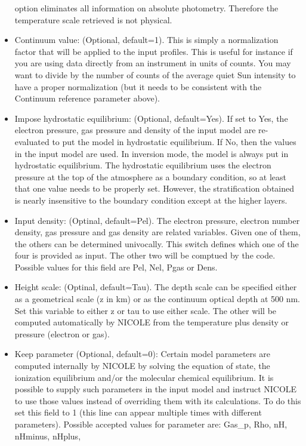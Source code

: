 \begin{itemize}
  option eliminates all information on absolute photometry. Therefore
  the temperature scale retrieved is not physical.
\item Continuum value: (Optional, default=1). This is simply a
  normalization factor that will be applied to the input
  profiles. This is useful for instance if you are using data
  directly from an instrument in units of counts. You may want to
  divide by the number of counts of the average quiet Sun intensity to
  have a proper normalization (but it needs to be consistent with the
  Continuum reference parameter above).
\item Impose hydrostatic equilibrium: (Optional, default=Yes). If set
  to Yes, the electron pressure, gas pressure and density of the input
  model are re-evaluated to put the model in hydrostatic
  equilibrium. If No, then the values in the input model are used. In
  inversion mode, the model is always put in hydrostatic equilibrium.
  The hydrostatic equilibrium uses the electron pressure at the top of
  the atmosphere as a boundary condition, so at least that one value
  needs to be properly set. However, the stratification obtained is nearly
  insensitive to the boundary condition except at the higher layers.
\item Input density: (Optinal, default=Pel). The electron pressure,
  electron number density, gas pressure and gas density are related
  variables. Given one of them, the others can be determined
  univocally. This switch defines which one of the four is provided
  as input. The other two will be comptued by the code. Possible
  values for this field are Pel, Nel, Pgas or Dens. 
\item Height scale: (Optinal, default=Tau). The depth scale can be
  specified either as a geometrical scale (z in km) or as the
  continuum optical depth at 500 nm. Set this variable to either z or
  tau to use either scale. The other will be computed automatically by
  NICOLE from the temperature plus density or pressure (electron or
  gas). 
\item Keep {parameter} (Optional, default=0): Certain model parameters
  are computed internally by NICOLE by solving the equation of state,
  the ionization equilibrium and/or the molecular chemical
  equilibrium. It is possible to supply such parameters in the input
  model and instruct NICOLE to use those values instead of overriding
  them with its calculations. To do this set this field to 1 (this
  line can appear multiple times with different parameters). Possible
  accepted values for parameter are: Gas\_p, Rho, nH, nHminus, nHplus,

\end{itemize}
